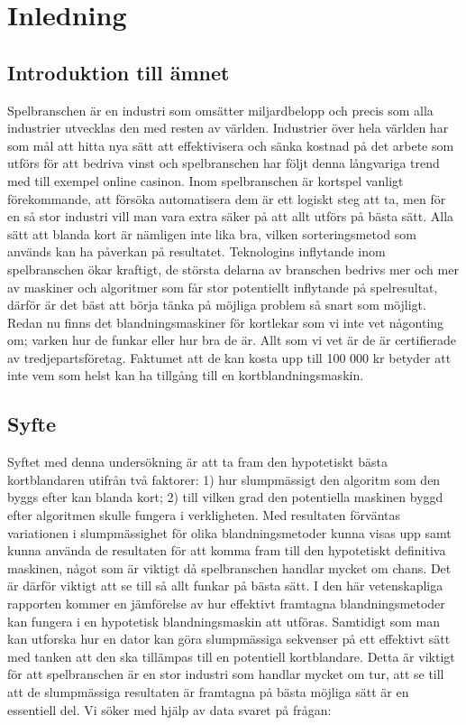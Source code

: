 \documentclass[swedish,a4paper]{article}
\begin{document}

\tableofcontents
\newpage

\section{Inledning}
\subsection{Introduktion till ämnet}

Spelbranschen är en industri som omsätter miljardbelopp och precis som alla
industrier utvecklas den med resten av världen. Industrier över hela världen har
som mål att hitta nya sätt att effektivisera och sänka kostnad på det arbete som
utförs för att bedriva vinst och spelbranschen har följt denna långvariga trend
med till exempel online casinon. Inom spelbranschen är kortspel vanligt
förekommande, att försöka automatisera dem är ett logiskt steg att ta, men för
en så stor industri vill man vara extra säker på att allt utförs på bästa sätt.
Alla sätt att blanda kort är nämligen inte lika bra, vilken sorteringsmetod som
används kan ha påverkan på resultatet. Teknologins inflytande inom spelbranschen
ökar kraftigt, de största delarna av branschen bedrivs mer och mer av maskiner
och algoritmer som får stor potentiellt inflytande på spelresultat, därför är
det bäst att börja tänka på möjliga problem så snart som möjligt. Redan nu finns
det blandningsmaskiner för kortlekar som vi inte vet någonting om; varken hur de
funkar eller hur bra de är. Allt som vi vet är de är certifierade av
tredjepartsföretag. Faktumet att de kan kosta upp till 100 000 kr betyder att
inte vem som helst kan ha tillgång till en kortblandningsmaskin.

\subsection{Syfte}

Syftet med denna undersökning är att ta fram den hypotetiskt bästa kortblandaren
utifrån två faktorer: 1) hur slumpmässigt den algoritm som den byggs efter kan
blanda kort; 2) till vilken grad den potentiella maskinen byggd efter algoritmen
skulle fungera i verkligheten. Med resultaten förväntas variationen i
slumpmässighet för olika blandningsmetoder kunna visas upp samt kunna använda de
resultaten för att komma fram till den hypotetiskt definitiva maskinen, något
som är viktigt då spelbranschen handlar mycket om chans. Det är därför viktigt
att se till så allt funkar på bästa sätt. I den här vetenskapliga rapporten
kommer en jämförelse av hur effektivt framtagna blandningsmetoder kan fungera i
en hypotetisk blandningsmaskin att utföras. Samtidigt som man kan utforska hur
en dator kan göra slumpmässiga sekvenser på ett effektivt sätt med tanken att
den ska tillämpas till en potentiell kortblandare. Detta är viktigt för att
spelbranschen är en stor industri som handlar mycket om tur, att se till att de
slumpmässiga resultaten är framtagna på bästa möjliga sätt är en essentiell del.
Vi söker med hjälp av data svaret på frågan:
\end{document}
